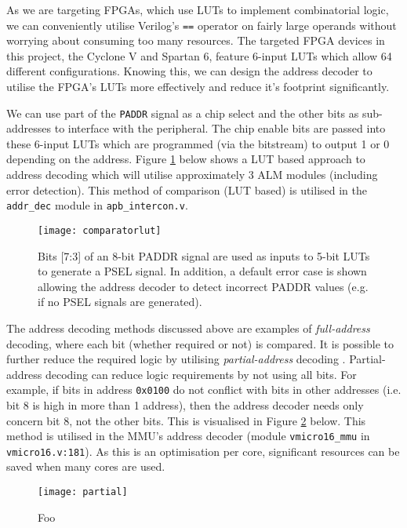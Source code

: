 As we are targeting FPGAs, which use LUTs to implement combinatorial logic, we can conveniently utilise Verilog's \verb|==| operator on fairly large operands without worrying about consuming too many resources. The targeted FPGA devices in this project, the Cyclone V and Spartan 6, feature 6-input LUTs which allow 64 different configurations. Knowing this, we can design the address decoder to utilise the FPGA's LUTs more effectively and reduce it's footprint significantly.

We can use part of the \verb|PADDR| signal as a chip select and the other bits as sub-addresses to interface with the peripheral. The chip enable bits are passed into these 6-input LUTs which are programmed (via the bitstream) to output 1 or 0 depending on the address. Figure \ref{fig:comparatorlut} below shows a LUT based approach to address decoding which will utilise approximately 3 ALM modules (including error detection). This method of comparison (LUT based) is utilised in the \verb|addr_dec| module in \verb|apb_intercon.v|.

\begin{figure}[H]
\centering
\texttt{[image: comparatorlut]}
\caption{Bits [7:3] of an 8-bit PADDR signal are used as inputs to 5-bit LUTs to generate a PSEL signal. In addition, a default error case is shown allowing the address decoder to detect incorrect PADDR values (e.g. if no PSEL signals are generated).}
\label{fig:comparatorlut}
\end{figure}

The address decoding methods discussed above are examples of \textit{full-address} decoding, where each bit (whether required or not) is compared. It is possible to further reduce the required logic by utilising \textit{partial-address} decoding \cite{tanenbaum2016structured}. Partial-address decoding can reduce logic requirements by not using all bits. For example, if bits in address \verb|0x0100| do not conflict with bits in other addresses (i.e. bit 8 is high in more than 1 address), then the address decoder needs only concern bit 8, not the other bits. This is visualised in Figure \ref{fig:partial} below. This method is utilised in the MMU's address decoder (module \verb|vmicro16_mmu| in \verb|vmicro16.v:181|). As this is an optimisation per core, significant resources can be saved when many cores are used.

\begin{figure}[H]
\centering
\texttt{[image: partial]}
\caption{Foo}
\label{fig:partial}
\end{figure}


